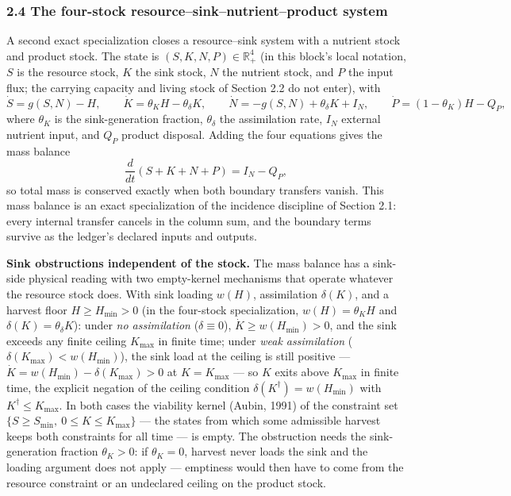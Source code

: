 \documentclass[11pt]{article}
\begin{document}
\subsubsection{2.4 The four-stock resource--sink--nutrient--product
system}\label{the-four-stock-resourcesinknutrientproduct-system}

A second exact specialization closes a resource--sink system with a
nutrient stock and product stock. The state is
\((S, K, N, P) \in \mathbb{R}^4_+\) (in this block's local notation,
\(S\) is the resource stock, \(K\) the sink stock, \(N\) the nutrient
stock, and \(P\) the input flux; the carrying capacity and living stock
of Section 2.2 do not enter), with
\[\dot S = g(S,N) - H, \qquad \dot K = \theta_K H - \theta_\delta K, \qquad \dot N = -g(S,N) + \theta_\delta K + I_N, \qquad \dot P = (1 - \theta_K)H - Q_P,\]
where \(\theta_K\) is the sink-generation fraction, \(\theta_\delta\)
the assimilation rate, \(I_N\) external nutrient input, and \(Q_P\)
product disposal. Adding the four equations gives the mass balance
\[\frac{d}{dt}(S + K + N + P) = I_N - Q_P,\] so total mass is conserved
exactly when both boundary transfers vanish. This mass balance is an
exact specialization of the incidence discipline of Section 2.1: every
internal transfer cancels in the column sum, and the boundary terms
survive as the ledger's declared inputs and outputs.

\textbf{Sink obstructions independent of the stock.} The mass balance
has a sink-side physical reading with two empty-kernel mechanisms that
operate whatever the resource stock does. With sink loading \(w(H)\),
assimilation \(\delta(K)\), and a harvest floor \(H \ge H_{\min} > 0\)
(in the four-stock specialization, \(w(H) = \theta_K H\) and
\(\delta(K) = \theta_\delta K\)): under \emph{no assimilation}
(\(\delta \equiv 0\)), \(\dot K \ge w(H_{\min}) > 0\), and the sink
exceeds any finite ceiling \(K_{\max}\) in finite time; under \emph{weak
assimilation} (\(\delta(K_{\max}) < w(H_{\min})\)), the sink load at the
ceiling is still positive ---
\(\dot K = w(H_{\min}) - \delta(K_{\max}) > 0\) at \(K = K_{\max}\) ---
so \(K\) exits above \(K_{\max}\) in finite time, the explicit negation
of the ceiling condition \(\delta(K^\dagger) = w(H_{\min})\) with
\(K^\dagger \le K_{\max}\). In both cases the viability kernel (Aubin,
1991) of the constraint set
\(\{S \ge S_{\min},\ 0 \le K \le K_{\max}\}\) --- the states from which
some admissible harvest keeps both constraints for all time --- is
empty. The obstruction needs the sink-generation fraction
\(\theta_K > 0\): if \(\theta_K = 0\), harvest never loads the sink and
the loading argument does not apply --- emptiness would then have to
come from the resource constraint or an undeclared ceiling on the
product stock.
\end{document}
